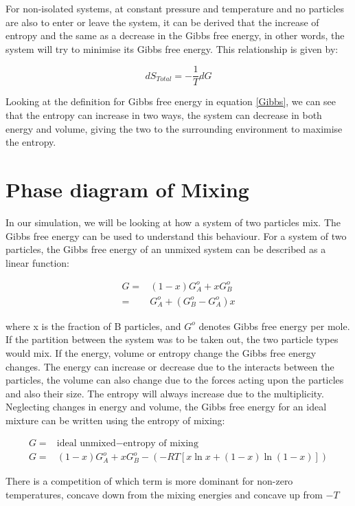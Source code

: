 \documentclass[../hand-in3.tex]{subfiles}
\begin{document}
For non-isolated systems, at constant pressure and temperature and no particles are also to enter or leave the system, it can be derived that the increase of entropy and the same as a decrease in the Gibbs free energy, in other words, the system will try to minimise its Gibbs free energy. This relationship is given by:

\begin{equation}
dS_{Total} = - \frac{1}{T} dG
\end{equation}

Looking at the definition for Gibbs free energy in equation \ref{Gibbs}, we can see that the entropy can increase in two ways, the system can decrease in both energy and volume, giving the two to the surrounding environment to maximise the entropy.

\section{Phase diagram of Mixing}

In our simulation, we will be looking at how a system of two particles mix. The Gibbs free energy can be used to understand this behaviour. For a system of two particles, the Gibbs free energy of an unmixed system can be described as a linear function:

\begin{align}
G =& (1-x)G_A^o + xG_B^o \\
  =& G_A^o + (G_B^o- G_A^o)x	
\end{align}   

where x is the fraction of B particles, and $G^o$ denotes Gibbs free energy per mole. If the partition between the system was to be taken out, the two particle types would mix. If the energy, volume or entropy change the Gibbs free energy changes. The energy can increase or decrease due to the interacts between the particles, the volume can also change due to the forces acting upon the particles and also their size. The entropy will always increase due to the multiplicity. Neglecting changes in energy and volume, the Gibbs free energy for an ideal mixture can be written using the entropy of mixing:

\begin{align}
G =& \text{ideal unmixed} - \text{entropy of mixing}\\ 
G =& (1-x)G_A^o + xG_B^o - \left(- RT \left[ x \ln x + (1-x) \ln (1-x) \right] \right)
\end{align} 

There is a competition of which term is more dominant for non-zero temperatures, concave down from the mixing energies and concave up from $-T$ 
\end{document}
